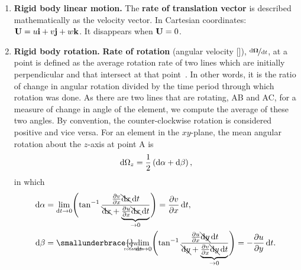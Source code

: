 \begin{enumerate}
  \item \textbf{Rigid body linear motion.}\quad
    The \textbf{rate of translation vector} is described mathematically as the velocity vector.
    In Cartesian coordinates: \(\mathbf{U} = u \mathrm{\mathbf{i}} + v \mathrm{\mathbf{j}} + w \mathrm{\mathbf{k}}\).
    It disappears when \(\mathbf{U} = 0\).

  \item \textbf{Rigid body rotation.}\quad
    \textbf{Rate of rotation} (angular velocity [\si{}]), \(\nicefrac{\mathop{}\!\mathrm{d}\boldsymbol{\mathbf{\Omega}}}{\mathop{}\!\mathrm{d} t}\), at a point is defined as the average rotation rate of two lines which are initially perpendicular and that intersect at that point~\cite{courseUniGeBottaro}.
      In other words, it is the ratio of change in angular rotation divided by the time period through which rotation was done.
      As there are two lines that are rotating, AB and AC, for a measure of change in angle of the element, we compute the average of these two angles.
        By convention, the counter-clockwise rotation is considered positive and vice versa.
        For an element in the \(xy\)-plane, the mean angular rotation about the \(z\)-axis at point A is
        \begin{equation}
          \mathop{}\!\mathrm{d} \Omega_z = \frac{1}{2} \left(\mathop{}\!\mathrm{d} \alpha + \mathop{}\!\mathrm{d} \beta\right),
          \label{eq:angular-rotation}
        \end{equation}
        in which
        \begin{equation}
          \begin{aligned}
            \d \alpha & = \lim_{\d t \to 0} \Biggl(\tan^{-1}\f{\ddx{v} \bcancel{\d x} \d t}{\bcancel{\d x} + \underbrace{{\textstyle\ddx{u}} \bcancel{\d x} \d t}_{\to 0}} \Biggr) = \ddx{v} \d t, \\
            \d \beta  & = \smallunderbrace{\mathclap{-}}_{\substack{\clap{\text{\tiny CW}}\\\clap{\text{\tiny rotation}}}} \lim_{\d t \to 0} \Biggl(\tan^{-1}\f{\ddx{u} \bcancel{\d y} \d t}{\bcancel{\d y} + \underbrace{{\textstyle\ddx{v}} \bcancel{\d y} \d t}_{\to 0}} \Biggr) = -\ddy{u} \d t.
          \end{aligned}
          \label{eq:differential-angles}

\end{equation}
\end{enumerate}
